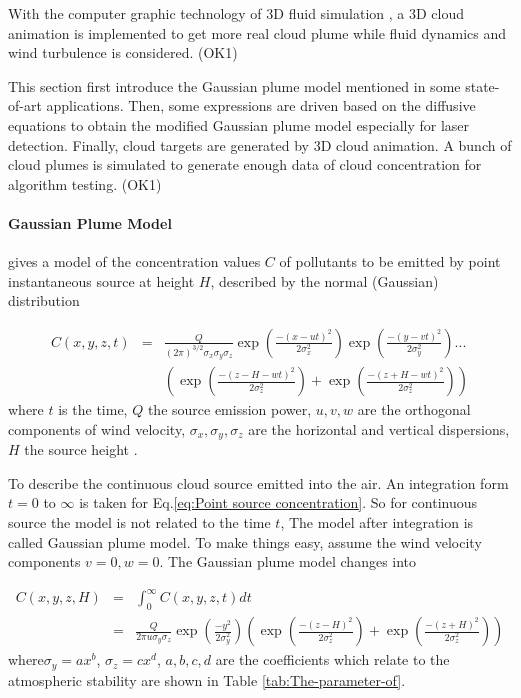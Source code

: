 With the computer graphic technology of 3D fluid simulation \cite{He2011},
a 3D cloud animation is implemented to get more real cloud plume while
fluid dynamics and wind turbulence is considered. (OK1)

This section first introduce the Gaussian plume model mentioned in
some state-of-art applications. Then, some expressions are driven
based on the diffusive equations to obtain the modified Gaussian plume
model especially for laser detection. Finally, cloud targets are generated
by 3D cloud animation. A bunch of cloud plumes is simulated to generate
enough data of cloud concentration for algorithm testing. (OK1)


\paragraph{Gaussian Plume Model }

\cite{N.Kh.2004} gives a model of the concentration values $C$ of
pollutants to be emitted by point instantaneous source at height $H$,
described by the normal (Gaussian) distribution 

\begin{eqnarray}
C(x,y,z,t) & = & \frac{Q}{(2\pi)^{3/2}\sigma_{x}\sigma_{y}\sigma_{z}}\exp\left(\tfrac{-\left(x-ut\right)^{2}}{2\sigma_{x}^{2}}\right)\exp\left(\tfrac{-\left(y-vt\right)^{2}}{2\sigma_{y}^{2}}\right)...\label{eq:Point source concentration}\\
 &  & \left(\exp\left(\tfrac{-\left(z-H-wt\right)^{2}}{2\sigma_{z}^{2}}\right)+\exp\left(\tfrac{-\left(z+H-wt\right)^{2}}{2\sigma_{z}^{2}}\right)\right)
\end{eqnarray}
where $t$ is the time, $Q$ the source emission power, $u,v,w$ are
the orthogonal components of wind velocity, $\sigma_{x},\sigma_{y},\sigma_{z}$
are the horizontal and vertical dispersions, $H$ the source height
. 

To describe the continuous cloud source emitted into the air. An integration
form $t=0$ to $\infty$ is taken for Eq.\ref{eq:Point source concentration}.
So for continuous source the model is not related to the time $t$,
 The model after integration is called Gaussian plume model. To make
things easy, assume the wind velocity components $v=0,w=0$. The Gaussian
plume model changes into

\begin{eqnarray}
C(x,y,z,H) & = & \int_{0}^{\infty}C(x,y,z,t)dt\label{eq:Continous source C}\\
 & = & \frac{Q}{2\pi u\sigma_{y}\sigma_{z}}\exp\left(\tfrac{-y^{2}}{2\sigma_{y}^{2}}\right)\left(\exp\left(\tfrac{-\left(z-H\right)^{2}}{2\sigma_{z}^{2}}\right)+\exp\left(\tfrac{-\left(z+H\right)^{2}}{2\sigma_{z}^{2}}\right)\right)\nonumber 
\end{eqnarray}
where$\sigma_{y}=ax^{b}$, $\sigma_{z}=cx^{d}$, $a,b,c,d$ are the
coefficients which relate to the atmospheric stability are shown in
Table \ref{tab:The-parameter-of}.



